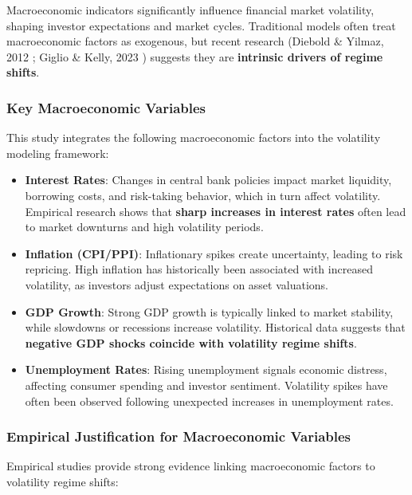 Macroeconomic indicators significantly influence financial market volatility, shaping investor expectations and market cycles.  
Traditional models often treat macroeconomic factors as exogenous, but recent research (Diebold \& Yilmaz, 2012 \cite{diebold_yilmaz_2012}; Giglio \& Kelly, 2023 \cite{giglio_kelly_2023}) suggests they are \textbf{intrinsic drivers of regime shifts}.  

\subsubsection{Key Macroeconomic Variables}
This study integrates the following macroeconomic factors into the volatility modeling framework:

\begin{itemize}

    \item \textbf{Interest Rates}: Changes in central bank policies impact market liquidity, borrowing costs, and risk-taking behavior, which in turn affect volatility.  
    Empirical research shows that \textbf{sharp increases in interest rates} often lead to market downturns and high volatility periods.
    \item \textbf{Inflation (CPI/PPI)}: Inflationary spikes create uncertainty, leading to risk repricing. High inflation has historically been associated with increased volatility, as investors adjust expectations on asset valuations.
    \item \textbf{GDP Growth}: Strong GDP growth is typically linked to market stability, while slowdowns or recessions increase volatility.  
    Historical data suggests that \textbf{negative GDP shocks coincide with volatility regime shifts}.
    \item \textbf{Unemployment Rates}: Rising unemployment signals economic distress, affecting consumer spending and investor sentiment.  
    Volatility spikes have often been observed following unexpected increases in unemployment rates.

\end{itemize}

\subsubsection{Empirical Justification for Macroeconomic Variables}
Empirical studies provide strong evidence linking macroeconomic factors to volatility regime shifts:

